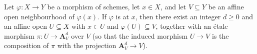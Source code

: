 \begin{lemma}
\label{lem:pc-smooth-etale-over-affine-space}
Let $\varphi:X\to Y$ be a morphism of schemes, let $x\in X$, and let
$V\subseteq Y$ be an affine open neighbourhood of $\varphi(x)$.  If
$\varphi$ is  at $x$, then
there exist an integer $d\ge0$ and an affine open $U\subseteq X$ with
$x\in U$ and $\varphi(U)\subseteq V$, together with an \'etale morphism
$\pi:U\to\mathbf A^d_V$ over $V$ (so that the induced morphism $U\to V$
is the composition of $\pi$ with the projection
$\mathbf A^d_V\to V$).
\end{lemma}
